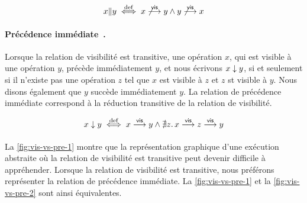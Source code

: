 \begin{equation*}
    x \| y \overset{\mathrm{def}}{\iff} x \not\overset{\mathsf{vis}}{\longrightarrow} y \land y \not\overset{\mathsf{vis}}{\longrightarrow} x
\end{equation*}

\paragraph{Précédence immédiate~\autocite{hernandez2003immediate,hernandez2015minimal}.}
Lorsque la relation de visibilité est transitive, une opération $x$, qui est visible à une opération $y$, précède immédiatement $y$, et nous écrivons $x \downarrow y$, si et seulement si il n'existe pas une opération $z$ tel que $x$ est visible à $z$ et $z$ st visible à $y$.
Nous disons également que $y$ succède immédiatement $y$.
La relation de précédence immédiate correspond à la réduction transitive de la relation de visibilité.

\begin{equation*}
    x \downarrow y \overset{\mathrm{def}}{\iff} x \overset{\mathsf{vis}}{\longrightarrow} y \land \nexists z \ldotp x \overset{\mathsf{vis}}{\longrightarrow} z \overset{\mathsf{vis}}{\longrightarrow} y
\end{equation*}

\paragraph{} La \autoref{fig:vis-vs-pre-1} montre que la représentation graphique d'une exécution abstraite où la relation de visibilité est transitive peut devenir difficile à appréhender.
Lorsque la relation de visibilité est transitive, nous préférons représenter la relation de précédence immédiate.
La \autoref{fig:vis-vs-pre-1} et la \autoref{fig:vis-vs-pre-2} sont ainsi équivalentes.

